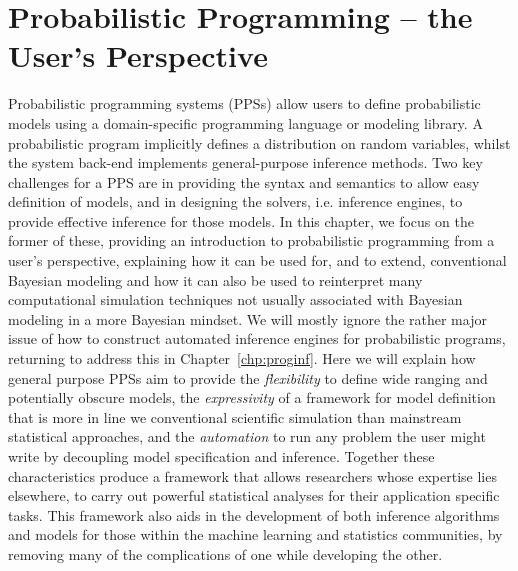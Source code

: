 
\chapter{Probabilistic Programming -- the User's Perspective}
\label{chp:probprog}

Probabilistic programming systems (PPSs) allow users to define probabilistic models 
using a domain-specific programming language or modeling library. A probabilistic program implicitly 
defines a distribution on random variables, whilst the system back-end implements 
general-purpose inference methods.  Two key challenges for a PPS are in providing the
syntax and semantics to allow easy definition of models, and in designing the solvers, i.e.
inference engines, to provide effective inference for those models.
In this chapter, we focus on the former of these, providing an introduction to 
probabilistic programming from a user's perspective, explaining how it can be used for, and
to extend, conventional Bayesian modeling and how it can also be used to reinterpret many computational simulation
techniques not usually associated with Bayesian modeling in a more Bayesian mindset.
We will mostly ignore the rather major issue of how to construct automated inference engines for probabilistic
programs, returning to address this in Chapter~\ref{chp:proginf}.
Here we will explain how general purpose PPSs aim to  provide 
the \emph{flexibility} to define
wide ranging and potentially obscure models, the \emph{expressivity} of a framework for 
model definition that is more in line we conventional scientific simulation than mainstream 
statistical approaches, and the \emph{automation} to  run any problem the user might write
by decoupling model specification and inference.
Together these characteristics produce a framework that allows researchers whose expertise 
lies elsewhere, to carry out powerful statistical analyses for their application specific tasks.  
This framework also aids in the development of both inference
algorithms and models for those within the machine learning and statistics communities,
by removing many of the complications of one while developing the other.
%

